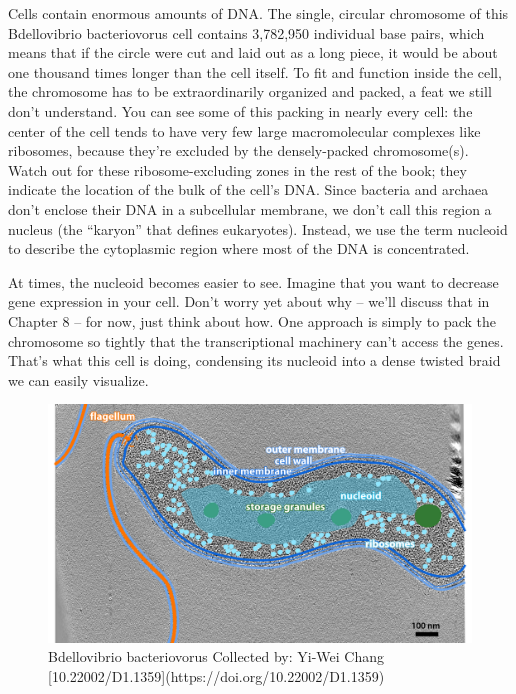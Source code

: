 \documentclass[]{tufte-book}
\begin{document}
Cells contain enormous amounts of DNA. The single, circular chromosome
of this Bdellovibrio bacteriovorus cell contains 3,782,950 individual
base pairs, which means that if the circle were cut and laid out as a
long piece, it would be about one thousand times longer than the cell
itself. To fit and function inside the cell, the chromosome has to be
extraordinarily organized and packed, a feat we still don't understand.
You can see some of this packing in nearly every cell: the center of the
cell tends to have very few large macromolecular complexes like
ribosomes, because they're excluded by the densely-packed chromosome(s).
Watch out for these ribosome-excluding zones in the rest of the book;
they indicate the location of the bulk of the cell's DNA. Since bacteria
and archaea don't enclose their DNA in a subcellular membrane, we don't
call this region a nucleus (the ``karyon'' that defines eukaryotes).
Instead, we use the term nucleoid to describe the cytoplasmic region
where most of the DNA is concentrated.

At times, the nucleoid becomes easier to see. Imagine that you want to
decrease gene expression in your cell. Don't worry yet about why --
we'll discuss that in Chapter 8 -- for now, just think about how. One
approach is simply to pack the chromosome so tightly that the
transcriptional machinery can't access the genes. That's what this cell
is doing, condensing its nucleoid into a dense twisted braid we can
easily visualize.

\begin{figure}
\includegraphics{img/2_10_Bbacteriovorus} \caption[Bdellovibrio bacteriovorus Collected by]{Bdellovibrio bacteriovorus Collected by: Yi-Wei Chang [10.22002/D1.1359](https://doi.org/10.22002/D1.1359)}\label{fig:unnamed-chunk-26}
\end{figure}
\end{document}
